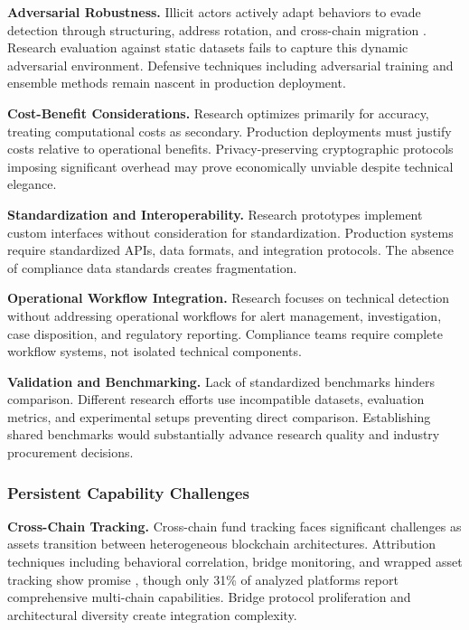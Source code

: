 \noindent\textbf{Adversarial Robustness.} 
Illicit actors actively adapt behaviors to evade detection through structuring, address rotation, and cross-chain migration \cite{albrecht2019usecryptocurrenciesmoney,guidara2022cryptocurrencymoneylaundering,wu2021detectingmixingservices}. Research evaluation against static datasets fails to capture this dynamic adversarial environment. Defensive techniques including adversarial training and ensemble methods remain nascent in production deployment.

\noindent\textbf{Cost-Benefit Considerations.} 
Research optimizes primarily for accuracy, treating computational costs as secondary. Production deployments must justify costs relative to operational benefits. Privacy-preserving cryptographic protocols imposing significant overhead may prove economically unviable despite technical elegance.

\noindent\textbf{Standardization and Interoperability.} 
Research prototypes implement custom interfaces without consideration for standardization. Production systems require standardized APIs, data formats, and integration protocols. The absence of compliance data standards creates fragmentation.

\noindent\textbf{Operational Workflow Integration.} 
Research focuses on technical detection without addressing operational workflows for alert management, investigation, case disposition, and regulatory reporting. Compliance teams require complete workflow systems, not isolated technical components.

\noindent\textbf{Validation and Benchmarking.} 
Lack of standardized benchmarks hinders comparison. Different research efforts use incompatible datasets, evaluation metrics, and experimental setups preventing direct comparison. Establishing shared benchmarks would substantially advance research quality and industry procurement decisions.

\subsubsection{Persistent Capability Challenges}

\noindent\textbf{Cross-Chain Tracking.} 
Cross-chain fund tracking faces significant challenges as assets transition between heterogeneous blockchain architectures. Attribution techniques including behavioral correlation, bridge monitoring, and wrapped asset tracking show promise \cite{yousaf2019tracingtransactionscryptocurrency,zamyatin2021sokcommunicationdistributed,zhang2024securitycrosschainbridges,li2025blockchaincrosschainbridge,lin2024crosschainabnormaltransaction}, though only 31\% of analyzed platforms report comprehensive multi-chain capabilities. Bridge protocol proliferation and architectural diversity create integration complexity.

